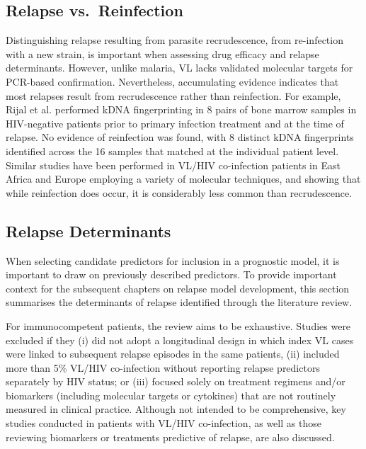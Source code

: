 \subsection{Relapse vs.\ Reinfection}

Distinguishing relapse resulting from parasite recrudescence, from re-infection with a new strain, is important when assessing drug efficacy and relapse determinants. However, unlike malaria\cite{WHO_2009_surveillance_antimalarial_drug_efficacy}, VL lacks validated molecular targets for PCR-based confirmation. Nevertheless, accumulating evidence indicates that most relapses result from recrudescence rather than reinfection. For example, Rijal et al. performed kDNA fingerprinting in 8 pairs of bone marrow samples in HIV-negative patients prior to primary infection treatment and at the time of relapse. No evidence of reinfection was found, with 8 distinct kDNA fingerprints identified across the 16 samples that matched at the individual patient level\cite{rijal2013}. Similar studies have been performed in VL/HIV co-infection patients in East Africa and Europe employing a variety of molecular techniques, and showing that while reinfection does occur, it is considerably less common than recrudescence\cite{franssen2021, morales2002, gelanew2010,lachaud2009}.

\subsection{Relapse Determinants\label{sec:relapse_det}}

When selecting candidate predictors for inclusion in a prognostic model, it is important to draw on previously described predictors\cite{collins2024A}. To provide important context for the subsequent chapters on relapse model development, this section summarises the determinants of relapse identified through the literature review.

For immunocompetent patients, the review aims to be exhaustive. Studies were excluded if they (i) did not adopt a longitudinal design in which index VL cases were linked to subsequent relapse episodes in the same patients, (ii) included more than 5\% VL/HIV co-infection without reporting relapse predictors separately by HIV status; or (iii) focused solely on treatment regimens and/or biomarkers (including molecular targets or cytokines) that are not routinely measured in clinical practice. Although not intended to be comprehensive, key studies conducted in patients with VL/HIV co-infection, as well as those reviewing biomarkers or treatments predictive of relapse, are also discussed.

